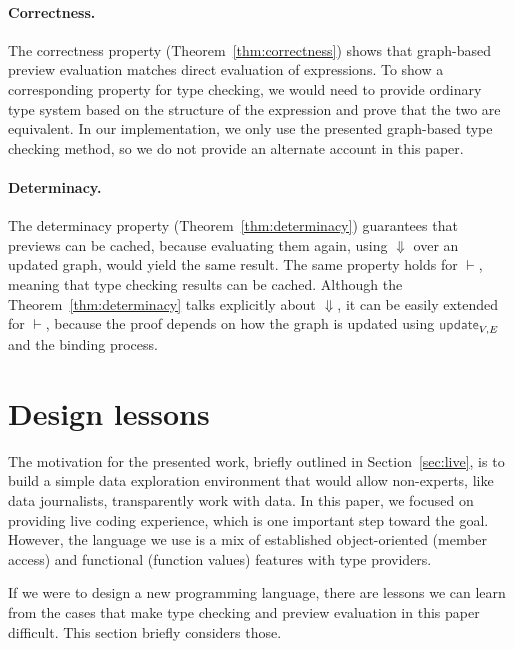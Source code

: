 \documentclass[acmsmall,anonymous,fleqn]{acmart}\settopmatter{printfolios=false,printccs=false,printacmref=false}
\theoremstyle{plain}
\theoremstyle{definition}
\newcommand{\ident}[1]{\textnormal{\textcolor{idclr}{\sffamily #1}}}
\begin{document}
\paragraph{Correctness.} The correctness property (Theorem~\ref{thm:correctness}) shows that
graph-based preview evaluation matches direct evaluation of expressions. To show a corresponding
property for type checking, we would need to provide ordinary type system based on the structure
of the expression and prove that the two are equivalent. In our implementation, we only use the
presented graph-based type checking method, so we do not provide an alternate account in this paper.

\paragraph{Determinacy.} The determinacy property (Theorem~\ref{thm:determinacy}) guarantees that
previews can be cached, because evaluating them again, using $\Downarrow$ over an updated graph,
would yield the same result. The same property holds for $\vdash$, meaning that type checking
results can be cached. Although the Theorem~\ref{thm:determinacy} talks explicitly about
$\Downarrow$, it can be easily extended for $\vdash$, because the proof depends on how the graph
is updated using $\ident{update}_{V,E}$ and the binding process.


\section{Design lessons}
\label{sec:design}

The motivation for the presented work, briefly outlined in Section~\ref{sec:live}, is to build a
simple data exploration environment that would allow non-experts, like data journalists,
transparently work with data. In this paper, we focused on providing live coding experience,
which is one important step toward the goal. However, the language we use is a mix of established
object-oriented (member access) and functional (function values) features with type providers.

If we were to design a new programming language, there are lessons we can learn from the
cases that make type checking and preview evaluation in this paper difficult. This section
briefly considers those.
\end{document}
